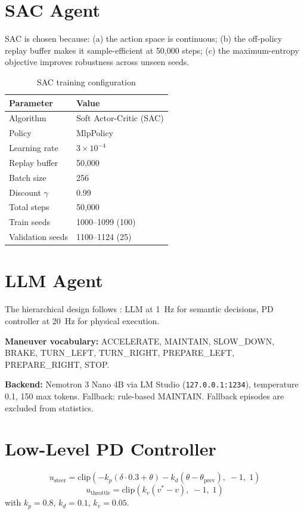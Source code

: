 \documentclass[12pt,a4paper]{report}
\begin{document}
\section{SAC Agent}

SAC is chosen because: (a) the action space is continuous; (b) the off-policy replay buffer makes it sample-efficient at 50,000 steps; (c) the maximum-entropy objective improves robustness across unseen seeds.

\begin{table}[H]
\centering
\caption{SAC training configuration}
\label{tab:sac}
\begin{tabular}{ll}
\toprule
Parameter & Value \\
\midrule
Algorithm & Soft Actor-Critic (SAC) \\
Policy & MlpPolicy \\
Learning rate & $3 \times 10^{-4}$ \\
Replay buffer & 50,000 \\
Batch size & 256 \\
Discount $\gamma$ & 0.99 \\
Total steps & 50,000 \\
Train seeds & 1000--1099 (100) \\
Validation seeds & 1100--1124 (25) \\
\bottomrule
\end{tabular}
\end{table}

\section{LLM Agent}

The hierarchical design follows \citet{ahn2022saycan}: LLM at 1~Hz for semantic decisions, PD controller at 20~Hz for physical execution.

\textbf{Maneuver vocabulary:} ACCELERATE, MAINTAIN, SLOW\_DOWN, BRAKE, TURN\_LEFT, TURN\_RIGHT, PREPARE\_LEFT, PREPARE\_RIGHT, STOP.

\textbf{Backend:} Nemotron 3 Nano 4B via LM Studio (\texttt{127.0.0.1:1234}), temperature 0.1, 150 max tokens. Fallback: rule-based MAINTAIN. Fallback episodes are excluded from statistics.

\section{Low-Level PD Controller}

\begin{equation}
u_{\text{steer}} = \text{clip}\!\left(-k_p(\delta \cdot 0.3 + \theta) - k_d(\theta - \theta_{\text{prev}}),\; -1,\; 1\right)
\end{equation}
\begin{equation}
u_{\text{throttle}} = \text{clip}\!\left(k_v(v^* - v),\; -1,\; 1\right)
\end{equation}
with $k_p = 0.8$, $k_d = 0.1$, $k_v = 0.05$.
\end{document}
